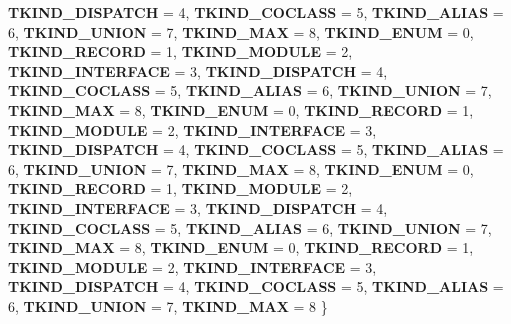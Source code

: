 \begin{DoxyCompactItemize}
\newline
{\bfseries T\+K\+I\+N\+D\+\_\+\+D\+I\+S\+P\+A\+T\+CH} = 4, 
{\bfseries T\+K\+I\+N\+D\+\_\+\+C\+O\+C\+L\+A\+SS} = 5, 
{\bfseries T\+K\+I\+N\+D\+\_\+\+A\+L\+I\+AS} = 6, 
{\bfseries T\+K\+I\+N\+D\+\_\+\+U\+N\+I\+ON} = 7, 
\newline
{\bfseries T\+K\+I\+N\+D\+\_\+\+M\+AX} = 8, 
{\bfseries T\+K\+I\+N\+D\+\_\+\+E\+N\+UM} = 0, 
{\bfseries T\+K\+I\+N\+D\+\_\+\+R\+E\+C\+O\+RD} = 1, 
{\bfseries T\+K\+I\+N\+D\+\_\+\+M\+O\+D\+U\+LE} = 2, 
\newline
{\bfseries T\+K\+I\+N\+D\+\_\+\+I\+N\+T\+E\+R\+F\+A\+CE} = 3, 
{\bfseries T\+K\+I\+N\+D\+\_\+\+D\+I\+S\+P\+A\+T\+CH} = 4, 
{\bfseries T\+K\+I\+N\+D\+\_\+\+C\+O\+C\+L\+A\+SS} = 5, 
{\bfseries T\+K\+I\+N\+D\+\_\+\+A\+L\+I\+AS} = 6, 
\newline
{\bfseries T\+K\+I\+N\+D\+\_\+\+U\+N\+I\+ON} = 7, 
{\bfseries T\+K\+I\+N\+D\+\_\+\+M\+AX} = 8, 
{\bfseries T\+K\+I\+N\+D\+\_\+\+E\+N\+UM} = 0, 
{\bfseries T\+K\+I\+N\+D\+\_\+\+R\+E\+C\+O\+RD} = 1, 
\newline
{\bfseries T\+K\+I\+N\+D\+\_\+\+M\+O\+D\+U\+LE} = 2, 
{\bfseries T\+K\+I\+N\+D\+\_\+\+I\+N\+T\+E\+R\+F\+A\+CE} = 3, 
{\bfseries T\+K\+I\+N\+D\+\_\+\+D\+I\+S\+P\+A\+T\+CH} = 4, 
{\bfseries T\+K\+I\+N\+D\+\_\+\+C\+O\+C\+L\+A\+SS} = 5, 
\newline
{\bfseries T\+K\+I\+N\+D\+\_\+\+A\+L\+I\+AS} = 6, 
{\bfseries T\+K\+I\+N\+D\+\_\+\+U\+N\+I\+ON} = 7, 
{\bfseries T\+K\+I\+N\+D\+\_\+\+M\+AX} = 8, 
{\bfseries T\+K\+I\+N\+D\+\_\+\+E\+N\+UM} = 0, 
\newline
{\bfseries T\+K\+I\+N\+D\+\_\+\+R\+E\+C\+O\+RD} = 1, 
{\bfseries T\+K\+I\+N\+D\+\_\+\+M\+O\+D\+U\+LE} = 2, 
{\bfseries T\+K\+I\+N\+D\+\_\+\+I\+N\+T\+E\+R\+F\+A\+CE} = 3, 
{\bfseries T\+K\+I\+N\+D\+\_\+\+D\+I\+S\+P\+A\+T\+CH} = 4, 
\newline
{\bfseries T\+K\+I\+N\+D\+\_\+\+C\+O\+C\+L\+A\+SS} = 5, 
{\bfseries T\+K\+I\+N\+D\+\_\+\+A\+L\+I\+AS} = 6, 
{\bfseries T\+K\+I\+N\+D\+\_\+\+U\+N\+I\+ON} = 7, 
{\bfseries T\+K\+I\+N\+D\+\_\+\+M\+AX} = 8, 
\newline
{\bfseries T\+K\+I\+N\+D\+\_\+\+E\+N\+UM} = 0, 
{\bfseries T\+K\+I\+N\+D\+\_\+\+R\+E\+C\+O\+RD} = 1, 
{\bfseries T\+K\+I\+N\+D\+\_\+\+M\+O\+D\+U\+LE} = 2, 
{\bfseries T\+K\+I\+N\+D\+\_\+\+I\+N\+T\+E\+R\+F\+A\+CE} = 3, 
\newline
{\bfseries T\+K\+I\+N\+D\+\_\+\+D\+I\+S\+P\+A\+T\+CH} = 4, 
{\bfseries T\+K\+I\+N\+D\+\_\+\+C\+O\+C\+L\+A\+SS} = 5, 
{\bfseries T\+K\+I\+N\+D\+\_\+\+A\+L\+I\+AS} = 6, 
{\bfseries T\+K\+I\+N\+D\+\_\+\+U\+N\+I\+ON} = 7, 
\newline
{\bfseries T\+K\+I\+N\+D\+\_\+\+M\+AX} = 8
 \}
\end{DoxyCompactItemize}

